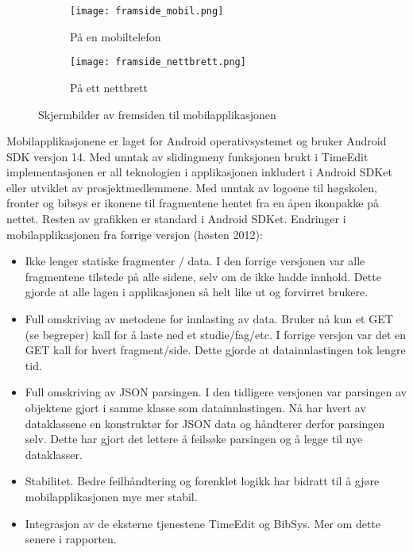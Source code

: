 \documentclass[../main.tex]{subfiles}
\begin{document}
\begin{figure}[H]
        \centering
        \begin{subfigure}[b]{0.3\textwidth}
                \centering
                \texttt{[image: framside\_mobil.png]}
                \caption{På en mobiltelefon}
        \end{subfigure}
        \quad
        \begin{subfigure}[b]{0.3\textwidth}
                \centering
                \texttt{[image: framside\_nettbrett.png]}
                \caption{På ett nettbrett}
        \end{subfigure}
        \caption{Skjermbilder av fremsiden til mobilapplikasjonen}
\end{figure}
\newline
Mobilapplikasjonene er laget for Android operativsystemet og bruker Android SDK versjon 14. Med unntak av slidingmeny funksjonen brukt i TimeEdit implementasjonen er all teknologien i applikasjonen inkludert i Android SDKet eller utviklet av prosjektmedlemmene. Med unntak av logoene til høgskolen, fronter og bibsys er ikonene til fragmentene hentet fra en åpen ikonpakke på nettet. Resten av grafikken er standard i Android SDKet.\newline
\newline
Endringer i mobilapplikasjonen fra forrige versjon (høsten 2012):
\begin{itemize}
\item Ikke lenger statiske fragmenter / data. I den forrige versjonen var alle fragmentene tilstede på alle sidene, selv om de ikke hadde innhold. Dette gjorde at alle lagen i applikasjonen så helt like ut og forvirret brukere.
\item Full omskriving av metodene for innlasting av data. Bruker nå kun et GET (se begreper) kall for å laste ned et studie/fag/etc. I forrige versjon var det en GET kall for hvert fragment/side. Dette gjorde at datainnlastingen tok lengre tid.
\item Full omskriving av JSON parsingen. I den tidligere versjonen var parsingen av objektene gjort i samme klasse som datainnlastingen. Nå har hvert av dataklassene en konstruktør for JSON data og håndterer derfor parsingen selv. Dette har gjort det lettere å feilsøke parsingen og å legge til nye dataklasser.
\item Stabilitet. Bedre feilhåndtering og forenklet logikk har bidratt til å gjøre mobilapplikasjonen mye mer stabil.
\item Integrasjon av de eksterne tjenestene TimeEdit og BibSys. Mer om dette senere i rapporten.
\end{itemize}
\end{document}
